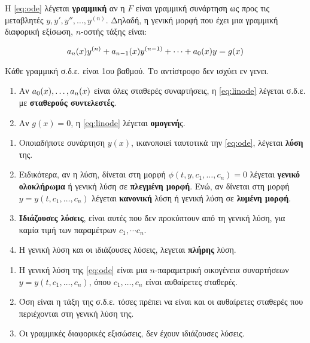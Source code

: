 \begin{dfn}
Η \eqref{eq:ode} λέγεται \textbf{γραμμική} αν η $F$ είναι γραμμική συνάρτηση ως προς τις μεταβλητές $y,y',y'',\ldots, y^{(n)}$. Δηλαδή, η γενική μορφή που έχει μια γραμμική διαφορική εξίσωση, $n$-οστής τάξης είναι:

\begin{equation}\label{eq:linode}
a_n(x)y^{(n)}+a_{n-1}(x)y^{(n-1)}+\cdots +a_0(x)y=g(x)
\end{equation}
\end{dfn}

\begin{rem}
Κάθε γραμμική σ.δ.ε. είναι 1ου βαθμού. Το αντίστροφο δεν ισχύει εν γενει. 
\end{rem}

\begin{dfns}
\begin{enumerate}
\item Αν $a_0(x),\ldots ,a_n(x)$ είναι όλες σταθερές συναρτήσεις, η \eqref{eq:linode} λέγεται σ.δ.ε. με \textbf{σταθερούς συντελεστές}.

\item Αν $g(x)=0$, η \eqref{eq:linode} λέγεται \textbf{ομογενή}ς.
\end{enumerate}
\end{dfns}

\begin{dfns}
\begin{enumerate}
\item Οποιαδήποτε συνάρτηση $y(x)$, ικανοποιεί ταυτοτικά την \eqref{eq:ode}, λέγεται \textbf{λύση} της. 

\item Ειδικότερα, αν η λύση, δίνεται στη μορφή $\phi(t,y,c_1,\ldots,c_n)=0$ λέγεται \textbf{γενικό ολοκλήρωμα} ή γενική λύση σε \textbf{πλεγμένη μορφή}. Ενώ, αν δίνεται στη μορφή $y=y(t,c_1,\dots,c_n)$ λέγεται \textbf{κανονική} λύση ή γενική λύση σε \textbf{λυμένη μορφή}.

\item \textbf{Ιδιάζουσες λύσεις}, είναι αυτές που δεν προκύπτουν από τη γενική λύση, για καμία τιμή των παραμέτρων $c_1,\cdots c_n$.

\item Η γενική λύση και οι ιδιάζουσες λύσεις, λεγεται \textbf{πλήρης} λύση.
\end{enumerate}
\end{dfns}


\begin{rems}
\begin{enumerate}
\item Η γενική λύση της \eqref{eq:ode} είναι μια $n$-παραμετρική οικογένεια συναρτήσεων $y=y(t,c_1,\ldots,c_n)$, όπου $c_1,\ldots,c_n$ είναι αυθαίρετες σταθερές. 

\item Όση είναι η τάξη της σ.δ.ε. τόσες πρέπει να είναι και οι αυθαίρετες σταθερές που περιέχονται στη γενική λύση της.

\item Οι γραμμικές διαφορικές εξισώσεις, δεν έχουν ιδιάζουσες λύσεις.
\end{enumerate}
\end{rems}

